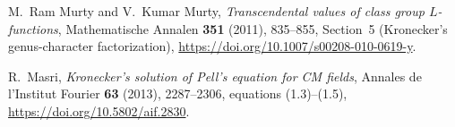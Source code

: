 M.~Ram Murty and V.~Kumar Murty,
\emph{Transcendental values of class group $L$-functions},
Mathematische Annalen \textbf{351} (2011), 835--855,
Section~5 (Kronecker's genus-character factorization),
\url{https://doi.org/10.1007/s00208-010-0619-y}.

R.~Masri,
\emph{Kronecker's solution of Pell's equation for CM fields},
Annales de l'Institut Fourier \textbf{63} (2013), 2287--2306,
equations (1.3)--(1.5),
\url{https://doi.org/10.5802/aif.2830}.
